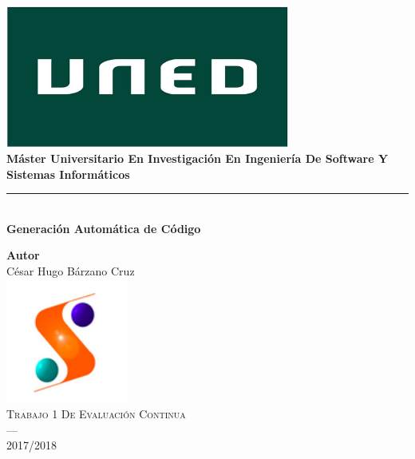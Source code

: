 \begin{titlepage}
 
 
\newlength{\centeroffset}
\setlength{\centeroffset}{-0.5\oddsidemargin}
\addtolength{\centeroffset}{0.5\evensidemargin}
\thispagestyle{empty}

\noindent\hspace*{\centeroffset}\begin{minipage}{\textwidth}

\centering
\includegraphics[width=0.7\textwidth]{imagenes/Logo-uned.jpg}\\[1.1cm]


{\Huge\bfseries Máster Universitario En Investigación En Ingeniería De Software Y Sistemas Informáticos\\
}
\noindent\rule[-1ex]{\textwidth}{3pt}\\[3.5ex]
{\large\bfseries Generación Automática de Código}
\end{minipage}

\vspace{2.5cm}
\noindent\hspace*{\centeroffset}\begin{minipage}{\textwidth}
\centering

\textbf{Autor}\\ {César Hugo Bárzano Cruz}\\[2.5ex]

\includegraphics[width=0.3\textwidth]{imagenes/Logo-master.png}\\[0.1cm]
\textsc{Trabajo 1 De Evaluación Continua}\\
\textsc{---}\\
2017/2018
\end{minipage}
\end{titlepage}


